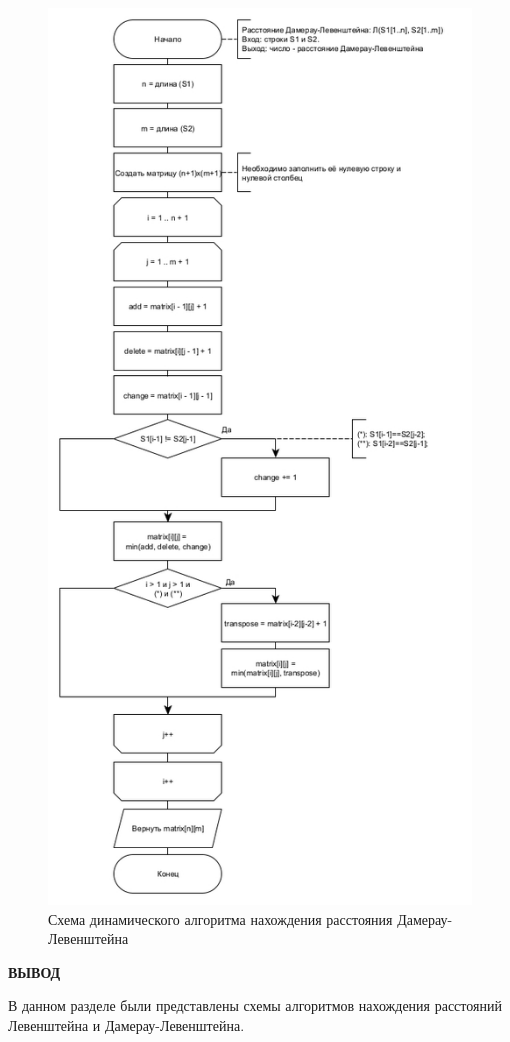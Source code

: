 \begin{figure}[h]
	\centering
	\includegraphics[scale=0.6]{img/damlevdyn.jpg}
	\caption{Схема динамического алгоритма нахождения расстояния Дамерау-Левенштейна}
	\label{fig:DL_rec}
\end{figure}

\clearpage

\textbf{ВЫВОД}

 В данном разделе были представлены схемы алгоритмов нахождения расстояний Левенштейна и Дамерау-Левенштейна.

\clearpage
